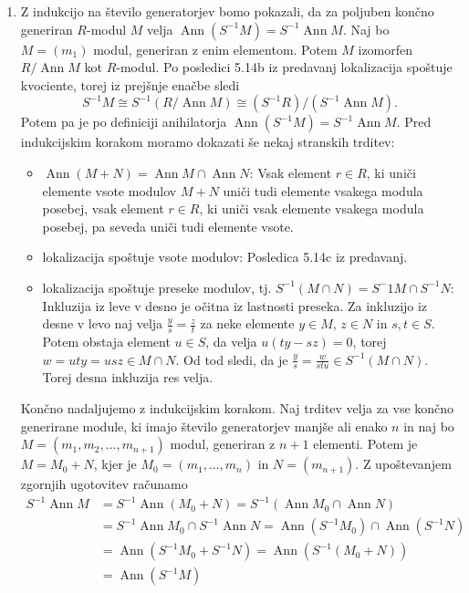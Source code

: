 \documentclass[a4paper, 12pt]{article}
\DeclareMathOperator{\Ann}{Ann}
\begin{document}
\begin{enumerate}[label=(\alph*)]
	\item Z indukcijo na število generatorjev bomo pokazali, da za poljuben končno generiran $R$-modul $M$ velja $\Ann(S^{-1}M) = S^{-1}\Ann M$.
	Naj bo $M = (m_1)$ modul, generiran z enim elementom. Potem $M$ izomorfen $R/\Ann M$ kot $R$-modul. Po posledici 5.14b iz predavanj lokalizacija spoštuje kvociente, torej iz prejšnje enačbe sledi
	\[
	S^{-1}M \cong S^{-1}\left( R/\Ann M \right) \cong (S^{-1}R)/(S^{-1}\Ann M). 
	\]
	Potem pa je po definiciji anihilatorja $\Ann(S^{-1}M) = S^{-1}\Ann M$.
	Pred indukcijskim korakom moramo dokazati še nekaj stranskih trditev:
	\begin{itemize}
		\item $\Ann (M + N) = \Ann M \cap \Ann N$: Vsak element $r \in R$, ki uniči elemente vsote modulov $M + N$ uniči tudi elemente vsakega modula posebej, vsak element $r \in R$, ki uniči vsak elemente vsakega modula posebej, pa seveda uniči tudi elemente vsote.
		\item lokalizacija spoštuje vsote modulov: Posledica 5.14c iz predavanj.
		\item lokalizacija spoštuje preseke modulov, tj. $S^{-1}(M \cap N) = S^-1M \cap S^{-1}N$: Inkluzija iz leve v desno je očitna iz lastnosti preseka. Za inkluzijo iz desne v levo naj velja $\frac{y}{s} = \frac{z}{t}$ za neke elemente $y \in M$, $z \in N$ in $s, t \in S$. Potem obstaja element $u \in S$, da velja $u(ty - sz) = 0$, torej $w = uty = usz \in M \cap N$. Od tod sledi, da je $\frac{y}{s} = \frac{w}{stu} \in S^{-1}(M \cap N)$. Torej desna inkluzija res velja.
	\end{itemize}
	Končno nadaljujemo z indukcijskim korakom. Naj trditev velja za vse končno generirane module, ki imajo število generatorjev manjše ali enako $n$ in naj bo $M = (m_1, m_2, \dots, m_{n+1})$ modul, generiran z $n+1$ elementi. Potem je $M = M_0 + N$, kjer je $M_0 = (m_1, \dots, m_n)$ in $N = (m_{n+1})$. Z upoštevanjem zgornjih ugotovitev računamo
	\begin{align*}
		S^{-1}\Ann M &= S^{-1}\Ann (M_0 + N) = S^{-1}(\Ann M_0 \cap \Ann N) \\
		&= S^{-1}\Ann M_0 \cap S^{-1}\Ann N = \Ann(S^{-1}M_0) \cap \Ann(S^{-1}N) \\
		&= \Ann(S^{-1}M_0 + S^{-1}N) = \Ann(S^{-1}(M_0 + N))\\
		&= \Ann(S^{-1}M)
	\end{align*}
\end{enumerate}
\end{document}
